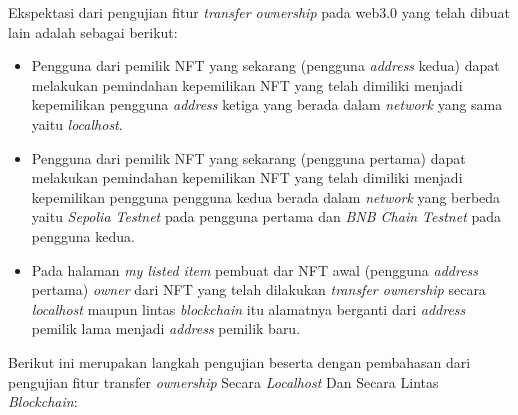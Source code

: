 Ekspektasi dari pengujian fitur \emph{transfer ownership} pada web3.0 yang telah dibuat lain adalah sebagai berikut:
\begin{itemize}
    \item Pengguna dari pemilik NFT yang sekarang (pengguna \emph{address} kedua) dapat melakukan pemindahan kepemilikan NFT yang telah dimiliki menjadi kepemilikan pengguna \emph{address} ketiga yang berada dalam \emph{network} yang sama yaitu \emph{localhost}.

    \item Pengguna dari pemilik NFT yang sekarang (pengguna pertama) dapat melakukan pemindahan kepemilikan NFT yang telah dimiliki menjadi kepemilikan pengguna pengguna kedua berada dalam \emph{network} yang berbeda yaitu \emph{Sepolia Testnet} pada pengguna pertama dan \emph{BNB Chain Testnet} pada pengguna kedua.

    \item Pada halaman \emph{my listed item} pembuat dar NFT awal (pengguna \emph{address} pertama) \emph{owner} dari NFT yang telah dilakukan \emph{transfer ownership} secara \emph{localhost} maupun lintas \emph{blockchain} itu alamatnya berganti dari \emph{address} pemilik lama menjadi \emph{address} pemilik baru. 
    
\end{itemize}

Berikut ini merupakan langkah pengujian beserta dengan pembahasan dari pengujian fitur transfer \emph{ownership} Secara \emph{Localhost} Dan Secara Lintas \emph{Blockchain}:


